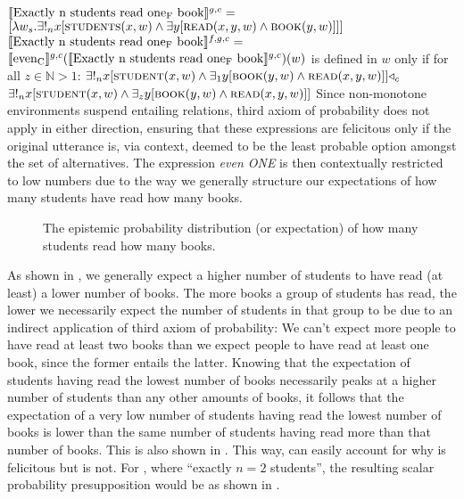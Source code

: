 \a{} $\intension[g,c]{Exactly n students read one\textsubscript{F} book}=$\\\emptyfill$[\lambda{w_s}.\exists!_n{x}[\predicate{students}(x,w)\land\exists{y}[\predicate{read}(x,y,w)\land\predicate{book}(y,w)]]]$
\a{} $\intension[f,g,c]{Exactly n students read one\textsubscript{F} book}=$\\\emptyfill{}
\xe
\ex{}
$\intension[g,c]{even\textsubscript{C}}(\intension[g,c]{Exactly n students read one\textsubscript{F} book})(w)$ is defined in $w$ only if for all $z\in\mathbb{N}>1$: $\exists!_n{x}[\predicate{student}(x,w)\land\exists_1{y}[\predicate{book}(y,w)\land\predicate{read}(x,y,w)]]\lprob_c$\\\emptyfill$\exists!_n{x}[\predicate{student}(x,w)\land\exists_z{y}[\predicate{book}(y,w)\land\predicate{read}(x,y,w)]]$
\xe
Since non-monotone environments suspend entailing relations,  third axiom of probability does not apply in either direction, ensuring that these expressions are felicitous only if the original utterance is, via context, deemed to be the least probable option amongst the set of alternatives. The expression \textit{even \MakeUppercase{one}} is then contextually restricted to low numbers due to the way we generally structure our expectations of how many students have read how many books.
\begin{figure}[!htb]
    
    \caption{The epistemic probability distribution (or expectation) of how many students read how many books.}
\end{figure}
As shown in , we generally expect a higher number of students to have read (at least) a lower number of books. The more books a group of students has read, the lower we necessarily expect the number of students in that group to be due to an indirect application of  third axiom of probability: We can't expect more people to have read at least two books than we expect people to have read at least one book, since the former entails the latter. Knowing that the expectation of students having read the lowest number of books necessarily peaks at a higher number of students than any other amounts of books, it follows that the expectation of a very low number of students having read the lowest number of books is lower than the same number of students having read more than that number of books. This is also shown in . This way, \textcite{Crnic2011,Crnic2014-dogma,Crnic2014-nm} can easily account for why  is felicitous but  is not. For , where \enquote{exactly $n=2$ students}, the resulting scalar probability presupposition would be as shown in .
